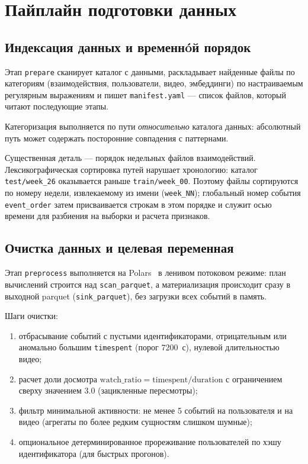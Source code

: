 \section{Пайплайн подготовки данных}

\subsection{Индексация данных и временнóй порядок}

Этап \texttt{prepare} сканирует каталог с данными, раскладывает найденные файлы по категориям (взаимодействия, пользователи, видео, эмбеддинги) по настраиваемым регулярным выражениям и пишет \texttt{manifest.yaml} --- список файлов, который читают последующие этапы.

Категоризация выполняется по пути \emph{относительно} каталога данных: абсолютный путь может содержать посторонние совпадения с паттернами.

Существенная деталь --- порядок недельных файлов взаимодействий.
Лексикографическая сортировка путей нарушает хронологию: каталог \texttt{test/week\_26} оказывается раньше \texttt{train/week\_00}.
Поэтому файлы сортируются по номеру недели, извлекаемому из имени (\texttt{week\_NN}); глобальный номер события \texttt{event\_order} затем присваивается строкам в этом порядке и служит осью времени для разбиения на выборки и расчета признаков.

\subsection{Очистка данных и целевая переменная}

Этап \texttt{preprocess} выполняется на Polars~\cite{polars-docs} в ленивом потоковом режиме: план вычислений строится над \texttt{scan\_parquet}, а материализация происходит сразу в выходной parquet (\texttt{sink\_parquet}), без загрузки всех событий в память.

Шаги очистки:
\begin{enumerate}
    \item отбрасывание событий с пустыми идентификаторами, отрицательным или аномально большим \texttt{timespent} (порог 7200~с), нулевой длительностью видео;
    \item расчет доли досмотра $\text{watch\_ratio} = \text{timespent} / \text{duration}$ с ограничением сверху значением 3.0 (зацикленные пересмотры);
    \item фильтр минимальной активности: не менее 5 событий на пользователя и на видео (агрегаты по более редким сущностям слишком шумные);
    \item опциональное детерминированное прореживание пользователей по хэшу идентификатора (для быстрых прогонов).
\end{enumerate}

